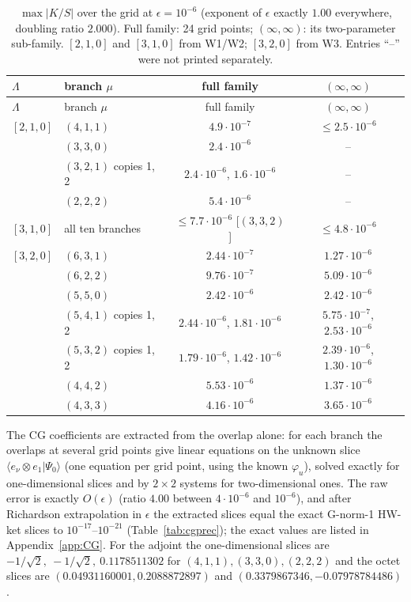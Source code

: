 \documentclass[11pt]{article}
\begin{document}
{\small
\begin{longtable}{llcc}
\caption{$\max|K/S|$ over the grid at $\epsilon=10^{-6}$ (exponent of $\epsilon$ exactly $1.00$ everywhere, doubling ratio $2.000$).
Full family: 24 grid points; $(\infty,\infty)$: its two-parameter sub-family. $[2,1,0]$ and $[3,1,0]$ from W1/W2; $[3,2,0]$ from W3.
Entries ``--'' were not printed separately.}\label{tab:KS}\\
\toprule
$\Lambda$ & branch $\mu$ & full family & $(\infty,\infty)$ \\
\midrule
\endfirsthead
\toprule
$\Lambda$ & branch $\mu$ & full family & $(\infty,\infty)$ \\
\midrule
\endhead
\bottomrule
\endlastfoot
$[2,1,0]$ & $(4,1,1)$ & $4.9\cdot10^{-7}$ & $\le2.5\cdot10^{-6}$ \\
 & $(3,3,0)$ & $2.4\cdot10^{-6}$ & -- \\
 & $(3,2,1)$ copies 1, 2 & $2.4\cdot10^{-6}$, $1.6\cdot10^{-6}$ & -- \\
 & $(2,2,2)$ & $5.4\cdot10^{-6}$ & -- \\
$[3,1,0]$ & all ten branches & $\le7.7\cdot10^{-6}$ [$(3,3,2)$] & $\le4.8\cdot10^{-6}$ \\
$[3,2,0]$ & $(6,3,1)$ & $2.44\cdot10^{-7}$ & $1.27\cdot10^{-6}$ \\
 & $(6,2,2)$ & $9.76\cdot10^{-7}$ & $5.09\cdot10^{-6}$ \\
 & $(5,5,0)$ & $2.42\cdot10^{-6}$ & $2.42\cdot10^{-6}$ \\
 & $(5,4,1)$ copies 1, 2 & $2.44\cdot10^{-6}$, $1.81\cdot10^{-6}$ & $5.75\cdot10^{-7}$, $2.53\cdot10^{-6}$ \\
 & $(5,3,2)$ copies 1, 2 & $1.79\cdot10^{-6}$, $1.42\cdot10^{-6}$ & $2.39\cdot10^{-6}$, $1.30\cdot10^{-6}$ \\
 & $(4,4,2)$ & $5.53\cdot10^{-6}$ & $1.37\cdot10^{-6}$ \\
 & $(4,3,3)$ & $4.16\cdot10^{-6}$ & $3.65\cdot10^{-6}$ \\
\end{longtable}}


The CG coefficients are extracted from the overlap alone: for each branch the overlaps at several grid points give linear equations on the unknown slice $\langle e_\nu\otimes e_1|\Psi_0\rangle$ (one equation per grid point, using the known $\varphi_u$), solved exactly for one-dimensional slices and by $2\times2$ systems for two-dimensional ones.
The raw error is exactly $O(\epsilon)$ (ratio $4.00$ between $4\cdot10^{-6}$ and $10^{-6}$), and after Richardson extrapolation in $\epsilon$ the extracted slices equal the exact G-norm-1 HW-ket slices to $10^{-17}$--$10^{-21}$ (Table~\ref{tab:cgprec}); the exact values are listed in Appendix~\ref{app:CG}.
For the adjoint the one-dimensional slices are $-1/\sqrt2,\ -1/\sqrt2,\ 0.1178511302$ for $(4,1,1),(3,3,0),(2,2,2)$ and the octet slices are $(0.04931160001,0.2088872897)$ and $(0.3379867346,-0.07978784486)$.
\end{document}
